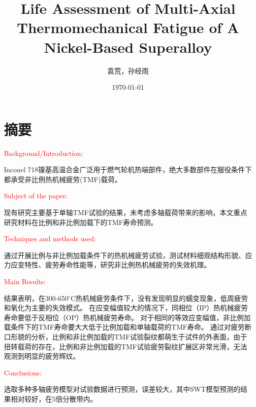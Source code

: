 \documentclass{article}
\newcommand{\marked}[1]{\textcolor{red}{#1}}
\begin{document}
\title{Life Assessment of Multi-Axial Thermomechanical Fatigue of A Nickel-Based Superalloy}

\author{袁荒，孙经雨}
\date{\today}
\maketitle

\section*{摘要}

\marked{Background/Introduction:}

Inconel 718镍基高温合金广泛用于燃气轮机热端部件，绝大多数部件在服役条件下都承受非比例热机械疲劳(TMF)载荷。

\marked{Subject of the paper:}

现有研究主要基于单轴TMF试验的结果，未考虑多轴载荷带来的影响，本文重点研究材料在比例和非比例加载下的TMF寿命预测。

\marked{Techniques and methods used:}

通过开展比例与非比例加载条件下的热机械疲劳试验，测试材料细观结构形貌、应力应变特性、疲劳寿命性能等，研究非比例热机械疲劳的失效机理。

\marked{Main Results:}

结果表明，在300-650$^{\circ}$C热机械疲劳条件下，没有发现明显的蠕变现象，低周疲劳和氧化为主要的失效模式。
在应变幅值较大的情况下，同相位（IP）热机械疲劳寿命要低于反相位（OP）热机械疲劳寿命。
对于相同的等效应变幅值，非比例加载条件下的TMF寿命要大大低于比例加载和单轴载荷的TMF寿命。
通过对疲劳断口形貌的分析，比例和非比例加载的TMF试验裂纹都萌生于试件的外表面，由于扭转载荷的存在，比例和非比例加载的TMF试验疲劳裂纹扩展区非常光滑，无法观测到明显的疲劳辉纹。

\marked{Conclusions:}

选取多种多轴疲劳模型对试验数据进行预测，误差较大，其中SWT模型预测的结果相对较好，在5倍分散带内。
\end{document}
